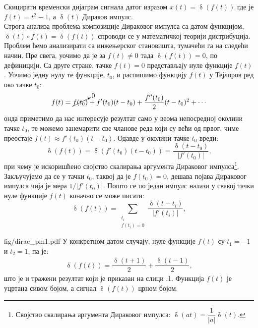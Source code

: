 \noindent
\PID 
Скицирати временски дијаграм сигнала датог изразом $x(t) = \updelta(f(t))$ где је 
$f(t) = t^2 - 1$, а
$\updelta(t)$ Дираков импулс. \\[2mm]

\RESENJE  
Строга анализа проблема композиције Дираковог импулса са датом функцијом, $\updelta(t) \circ f(t) = \updelta(f(t))$ 
спроводи се у математичкој теорији дистрибуција. Проблем ћемо анализирати са инжењерског становишта, 
тумачећи га на следећи начин. Пре свега, уочимо да је за $f(t) \neq 0$ тада $\updelta(f(t)) = 0$, по дефиницији.    
Са друге стране, тачке $f(t) = 0$ представљају нуле функције $f(t)$. Уочимо једну нулу те функције, $t_0$, и распишимо
функцију $f(t)$ у Тејлоров ред око тачке $t_0$:
\begin{eqnarray}
    f(t) = \cancelto{0}{f(t_0)} + f'(t_0) (t-t_0) + \dfrac{f''(t_0)}{2} (t-t_0)^2 + \cdots
\end{eqnarray}
онда приметимо да нас интересује резултат само у веома непосредној околини тачке $t_0$, те можемо занемарити све
чланове реда који су већи од првог, чиме преостаје $f(t) \approx f'(t_0) (t-t_0)$. Одавде у околини тачке 
$t_0$ вреди: 
\begin{equation}
    \updelta(f(t)) = \updelta(f'(t_0) (t-t_0)) = \dfrac{\updelta(t-t_0)}{|f'(t_0)|},
\end{equation}
при чему је искоришћено својство скалирања аргумента Дираковог импулса\footnote{Својство скалирања аргумента Дираковог импулса:
$\updelta(at) = \dfrac{1}{|a|} \updelta(t)$.}.
Закључујемо да се у тачки $t_0$, таквој да је $f(t_0) = 0$, дешава појава Дираковог импулса чија је мера $1/|f'(t_0)|$.
Пошто се по један импулс налази у свакој тачки нуле функције $f(t)$ коначно се може писати:
\begin{equation}
    \updelta(f(t)) = \sum_{\substack{t_i \\[0.5mm] f(t_i)=0}} \dfrac{\updelta(t-t_i)}{|f'(t_i)|},
\end{equation}

\begin{slikaDesno}{fig/dirac_pm1.pdf}
У конкретном датом случају, нуле функције $f(t)$ су ${t_1 = -1}$ и {$t_2 = 1$}, па је:
\begin{eqnarray}
    \updelta(f(t)) = \dfrac{\updelta(t+1)}{2} + \dfrac{\updelta(t-1)}{2},
\end{eqnarray}
што је и тражени резултат који је приказан на слици \ID.1.
Функција $f(t)$ је уцртана сивом бојом, а сигнал $\updelta(f(t))$ црном бојом.

\end{slikaDesno}